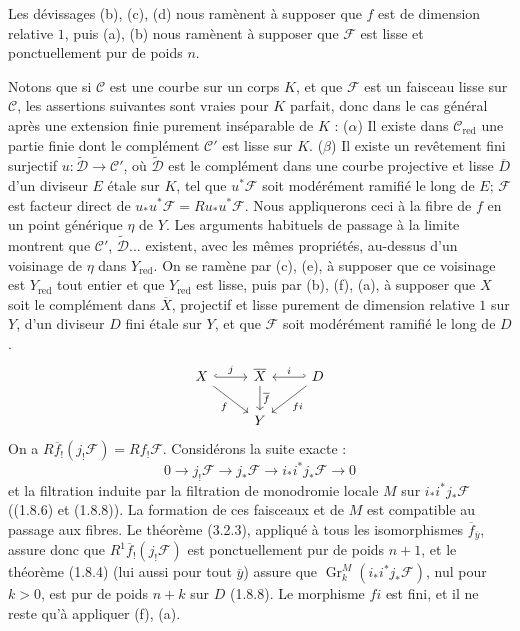 \documentclass[12pt,a4paper]{article}
\theoremstyle{plain}
\theoremstyle{definition}
\theoremstyle{remark}
\DeclareMathOperator{\Gr}{Gr}
\begin{document}
Les d\'evissages (b), (c), (d) nous ram\`enent \`a supposer que $f$ est de dimension relative $1$, puis (a), (b) nous ram\`enent \`a supposer que $\mathscr{F}$ est lisse et ponctuellement pur de poids $n$.

Notons que si $\mathscr{C}$ est une courbe sur un corps $K$, et que $\mathscr{F}$ est un faisceau lisse sur $\mathscr{C}$, les assertions suivantes sont vraies pour $K$ parfait, donc dans le cas g\'en\'eral apr\`es une extension finie purement ins\'eparable de $K$ : ($\alpha$) Il existe dans $\mathscr{C}_{\text{red}}$ une partie finie dont le compl\'ement $\mathscr{C}'$ est lisse sur $K$. ($\beta$) Il existe un rev\^etement fini surjectif $u : \widetilde{\mathscr{D}} \to \mathscr{C}'$, o\`u $\widetilde{\mathscr{D}}$ est le compl\'ement dans une courbe projective et lisse $\overline{D}$ d'un diviseur $E$ \'etale sur $K$, tel que $u^*\mathscr{F}$ soit mod\'er\'ement ramifi\'e le long de $E$; $\mathscr{F}$ est facteur direct de $u_* u^*\mathscr{F} = Ru_* u^*\mathscr{F}$. Nous appliquerons ceci \`a la fibre de $f$ en un point g\'en\'erique $\eta$ de $Y$. Les arguments habituels de passage \`a la limite montrent que $\mathscr{C}'$, $\widetilde{\mathscr{D}}$... existent, avec les m\^emes propri\'et\'es, au-dessus d'un voisinage de $\eta$ dans $Y_{\text{red}}$. On se ram\`ene par (c), (e), \`a supposer que ce voisinage est $Y_{\text{red}}$ tout entier et que $Y_{\text{red}}$ est lisse, puis par (b), (f), (a), \`a supposer que $X$ soit le compl\'ement dans $\overline{X}$, projectif et lisse purement de dimension relative $1$ sur $Y$, d'un diviseur $D$ fini \'etale sur $Y$, et que $\mathscr{F}$ soit mod\'er\'ement ramifi\'e le long de $D$.
\[
\begin{tikzcd}
X \arrow[r, hook, "j"] \arrow[dr, "f"'] & \overline{X} \arrow[d, "\overline{f}"] & D \arrow[l, hook', "i"'] \arrow[dl, "fi"] \\
& Y &
\end{tikzcd}
\]
On a $R\overline{f}_! (j_! \mathscr{F}) = Rf_! \mathscr{F}$. Consid\'erons la suite exacte :
\[ 0 \to j_! \mathscr{F} \to j_* \mathscr{F} \to i_* i^* j_* \mathscr{F} \to 0 \]
et la filtration induite par la filtration de monodromie locale $M$ sur $i_* i^* j_* \mathscr{F}$ ((1.8.6) et (1.8.8)). La formation de ces faisceaux et de $M$ est compatible au passage aux fibres. Le th\'eor\`eme (3.2.3), appliqu\'e \`a tous les isomorphismes $\overline{f}_{\overline{y}}$, assure donc que $R^1 \overline{f}_! (j_! \mathscr{F})$ est ponctuellement pur de poids $n + 1$, et le th\'eor\`eme (1.8.4) (lui aussi pour tout $\overline{y}$) assure que $\Gr_k^M (i_* i^* j_* \mathscr{F})$, nul pour $k > 0$, est pur de poids $n + k$ sur $D$ (1.8.8). Le morphisme $fi$ est fini, et il ne reste qu'\`a appliquer (f), (a).
\end{document}
